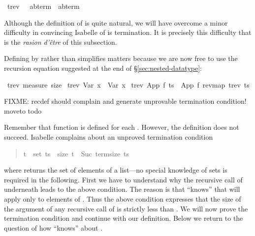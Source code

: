 %
\begin{isabellebody}%
\ trev\ \ {\isacharcolon}{\isacharcolon}\ {\isachardoublequote}{\isacharparenleft}{\isacharprime}a{\isacharcomma}{\isacharprime}b{\isacharparenright}term\ {\isacharequal}{\isachargreater}\ {\isacharparenleft}{\isacharprime}a{\isacharcomma}{\isacharprime}b{\isacharparenright}term{\isachardoublequote}%
\begin{isamarkuptext}%
\noindent
Although the definition of  is quite natural, we will have
overcome a minor difficulty in convincing Isabelle of is termination.
It is precisely this difficulty that is the \textit{rasion d'\^etre} of
this subsection.

Defining  by  rather than 
simplifies matters because we are now free to use the recursion equation
suggested at the end of \S\ref{sec:nested-datatype}:%
\end{isamarkuptext}%
\ trev\ {\isachardoublequote}measure\ size{\isachardoublequote}\isanewline
\ {\isachardoublequote}trev\ {\isacharparenleft}Var\ x{\isacharparenright}\ {\isacharequal}\ Var\ x{\isachardoublequote}\isanewline
\ {\isachardoublequote}trev\ {\isacharparenleft}App\ f\ ts{\isacharparenright}\ {\isacharequal}\ App\ f\ {\isacharparenleft}rev{\isacharparenleft}map\ trev\ ts{\isacharparenright}{\isacharparenright}{\isachardoublequote}%
\begin{isamarkuptext}%
FIXME: recdef should complain and generate unprovable termination condition!
moveto todo

Remember that function  is defined for each .
However, the definition does not succeed. Isabelle complains about an unproved termination
condition
\begin{quote}

\begin{isabelle}%
\mbox{t}\ {\isasymin}\ set\ \mbox{ts}\ {\isasymlongrightarrow}\ size\ \mbox{t}\ {\isacharless}\ Suc\ {\isacharparenleft}term{\isacharunderscore}size\ \mbox{ts}{\isacharparenright}
\end{isabelle}%

\end{quote}
where  returns the set of elements of a list---no special knowledge of sets is
required in the following.
First we have to understand why the recursive call of  underneath  leads
to the above condition. The reason is that  ``knows'' that  will
apply  only to elements of . Thus the above condition expresses that
the size of the argument  of any recursive call of  is strictly
less than .
We will now prove the termination condition and continue with our definition.
Below we return to the question of how  ``knows'' about .%
\end{isamarkuptext}%
\end{isabellebody}%
